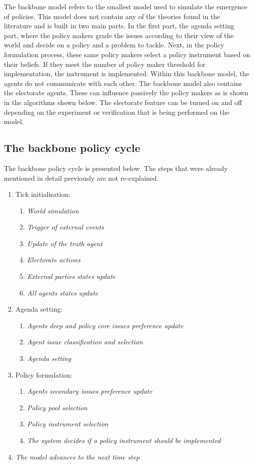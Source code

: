 The backbone model refers to the smallest model used to simulate the emergence of policies. This model does not contain any of the theories found in the literature and is built in two main parts. In the first part, the agenda setting part, where the policy makers grade the issues according to their view of the world and decide on a policy and a problem to tackle. Next, in the policy formulation process, these same policy makers select a policy instrument based on their beliefs. If they meet the number of policy maker threshold for implementation, the instrument is implemented. Within this backbone model, the agents do not communicate with each other. The backbone model also contains the electorate agents. These can influence passively the policy makers as is shown in the algorithms shown below. The electorate feature can be turned on and off depending on the experiment or verification that is being performed on the model.

\subsection{The backbone policy cycle}

The backbone policy cycle is presented below. The steps that were already mentioned in detail previously are not re-explained.

\begin{enumerate}
\item Tick initialisation:
	\begin{enumerate}
	\item \emph{World simulation}
	\item \emph{Trigger of external events}
	\item \emph{Update of the truth agent}
	\item \emph{Electorate actions}
	\item \emph{External parties states update}
	\item \emph{All agents states update}
	\end{enumerate}
\item Agenda setting:
	\begin{enumerate}
	\item \emph{Agents deep and policy core issues preference update}
	\item \emph{Agent issue classification and selection}
	\item \emph{Agenda setting}
	\end{enumerate}
\item Policy formulation:
	\begin{enumerate}
	\item \emph{Agents secondary issues preference update}
	\item \emph{Policy pool selection}
	\item \emph{Policy instrument selection}
	\item \emph{The system decides if a policy instrument should be implemented}
	\end{enumerate}
\item \emph{The model advances to the next time step}
\end{enumerate}

